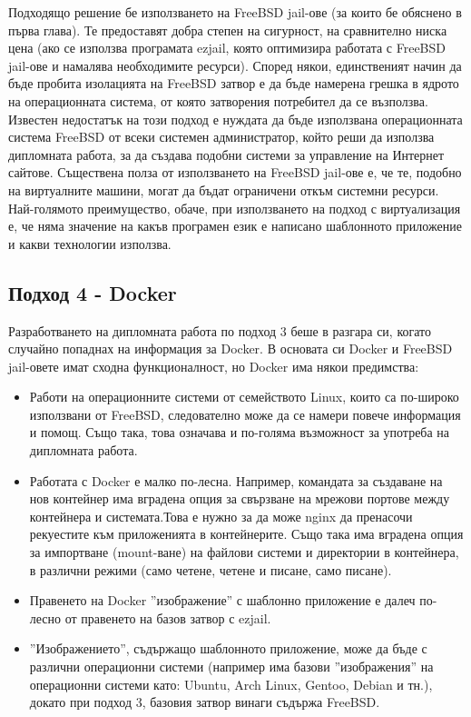 \documentclass[pdftex,14pt,a4paper]{extreport}
\begin{document}
Подходящо решение бе използването на FreeBSD jail-ове (за които бе обяснено в първа глава). Те предоставят добра степен на сигурност, на сравнително ниска цена (ако се използва програмата ezjail, която оптимизира работата с FreeBSD jail-ове и намалява необходимите ресурси). Според някои, единственият начин да бъде пробита изолацията на FreeBSD затвор е да бъде намерена грешка в ядрото на операционната система, от която затворения потребител да се възползва. Известен недостатък на този подход е нуждата да бъде използвана операционната система FreeBSD от всеки системен администратор, който реши да използва дипломната работа, за да създава подобни системи за управление на Интернет сайтове. Съществена полза от използването на FreeBSD jail-ове е, че те, подобно на виртуалните машини, могат да бъдат ограничени откъм системни ресурси. Най-голямото преимущество, обаче, при използването на подход с виртуализация е, че няма значение на какъв програмен език е написано шаблонното приложение и какви технологии използва.
\subsection {Подход 4 - Docker}
Разработването на дипломната работа по подход 3 беше в разгара си, когато случайно попаднах на информация за Docker. В основата си Docker и FreeBSD jail-овете имат сходна функционалност, но Docker има някои предимства:
\begin{itemize}
  \item Работи на операционните системи от семейството Linux, които са по-широко използвани от FreeBSD, следователно може да се намери повече информация и помощ. Също така, това означава и по-голяма възможност за употреба на дипломната работа.
  \item Работата с Docker е малко по-лесна. Например, командата за създаване на нов контейнер има вградена опция за свързване на мрежови портове между контейнера и системата.Това е нужно за да може nginx да пренасочи рекуестите към приложенията в контейнерите. Също така има вградена опция за импортване (mount-ване) на файлови системи и директории в контейнера, в различни режими (само четене, четене и писане, само писане).
  \item Правенето на Docker ''изображение'' с шаблонно приложение е далеч по-лесно от правенето на базов затвор с ezjail.
  \item ''Изображението'', съдържащо шаблонното приложение, може да бъде с различни операционни системи (например има базови ''изображения'' на операционни системи като: Ubuntu, Arch Linux, Gentoo, Debian и тн.), докато при подход 3, базовия затвор винаги съдържа FreeBSD.
\end{itemize}
\end{document}
